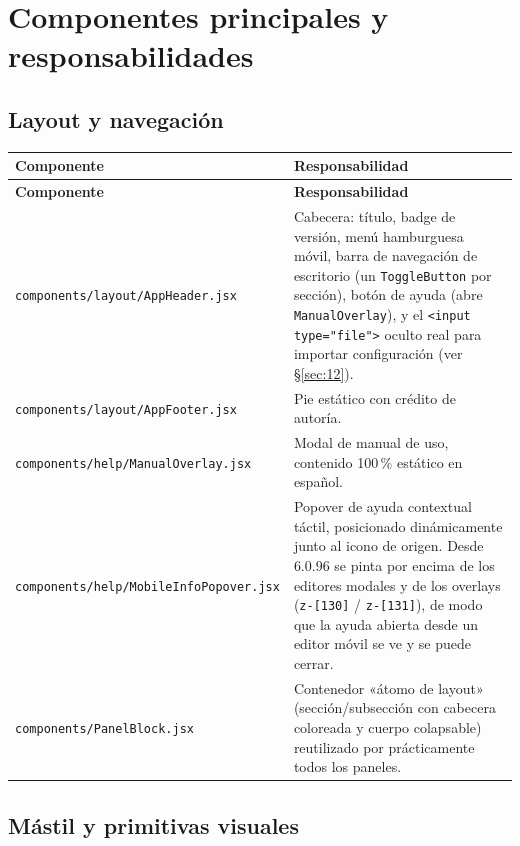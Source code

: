 \documentclass[a4paper,11pt,oneside]{report}
\newcommand{\Sref}[1]{\S\ref{#1}}
\begin{document}
\chapter{Componentes principales y responsabilidades}
\label{sec:5}

\section{Layout y navegación}
\label{sec:5.1}

\begin{center}
\begin{longtable}{L{5.0cm}L{9.3cm}}
\toprule
{}\textbf{Componente} & \textbf{Responsabilidad}\\
\midrule
\endfirsthead
{}\textbf{Componente} & \textbf{Responsabilidad}\\
\midrule
\endhead
\bottomrule
\endlastfoot
\lstinline!components/layout/AppHeader.jsx! & Cabecera: título, badge de versión, menú hamburguesa móvil, barra de navegación de escritorio (un \lstinline!ToggleButton! por sección), botón de ayuda (abre \lstinline!ManualOverlay!), y el \lstinline!<input type="file">! oculto real para importar configuración (ver \Sref{sec:12}).\\
\lstinline!components/layout/AppFooter.jsx! & Pie estático con crédito de autoría.\\
\lstinline!components/help/ManualOverlay.jsx! & Modal de manual de uso, contenido 100\,\% estático en español.\\
\lstinline!components/help/MobileInfoPopover.jsx! & Popover de ayuda contextual táctil, posicionado dinámicamente junto al icono de origen. Desde 6.0.96 se pinta por encima de los editores modales y de los overlays (\lstinline!z-[130]! / \lstinline!z-[131]!), de modo que la ayuda abierta desde un editor móvil se ve y se puede cerrar.\\
\lstinline!components/PanelBlock.jsx! & Contenedor «átomo de layout» (sección/subsección con cabecera coloreada y cuerpo colapsable) reutilizado por prácticamente todos los paneles.\\
\end{longtable}
\end{center}

\section{Mástil y primitivas visuales}
\label{sec:5.2}
\end{document}
